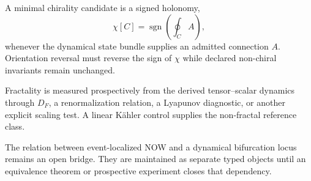 A minimal chirality candidate is a signed holonomy,
\[
\chi[C]=\operatorname{sgn}\!\left(\oint_C A\right),
\]
whenever the dynamical state bundle supplies an admitted connection \(A\). Orientation reversal must reverse the sign of \(\chi\) while declared non-chiral invariants remain unchanged.

Fractality is measured prospectively from the derived tensor--scalar dynamics through \(D_F\), a renormalization relation, a Lyapunov diagnostic, or another explicit scaling test. A linear Kähler control supplies the non-fractal reference class.

The relation between event-localized NOW and a dynamical bifurcation locus remains an open bridge. They are maintained as separate typed objects until an equivalence theorem or prospective experiment closes that dependency.

